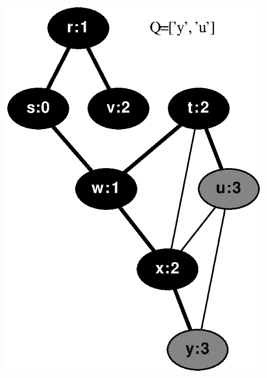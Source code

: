 \documentclass{article}
\begin{document}
\includegraphics[height=.3\textheight]{clrs_example_bfs_06.eps}
\vspace{1em}
\end{document}

